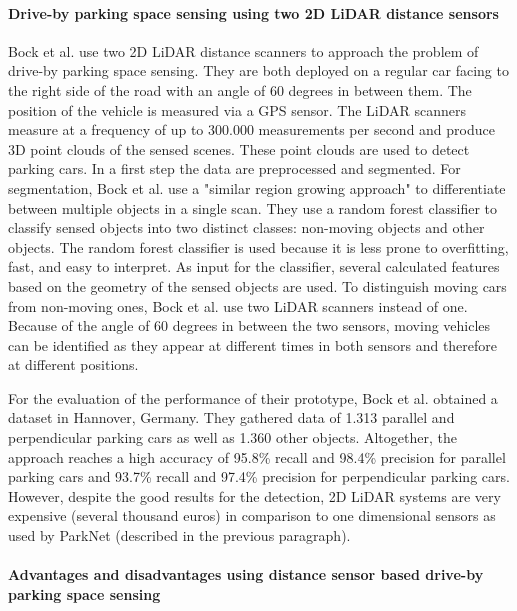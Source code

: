 \paragraph{Drive-by parking space sensing using two 2D LiDAR distance sensors}

Bock et al. \cite{Bock2015} use two 2D LiDAR distance scanners to approach the problem of drive-by parking space sensing. They are both deployed on a regular car facing to the right side of the road with an angle of 60 degrees in between them. The position of the vehicle is measured via a GPS sensor.
The LiDAR scanners measure at a frequency of up to 300.000 measurements per second and produce 3D point clouds of the sensed scenes. These point clouds are used to detect parking cars. In a first step the data are preprocessed and segmented. For segmentation, Bock et al. use a "similar region growing approach" to differentiate between multiple objects in a single scan. They use a random forest classifier to classify sensed objects into two distinct classes: non-moving objects and other objects. The random forest classifier is used because it is less prone to overfitting, fast, and easy to interpret. As input for the classifier, several calculated features based on the geometry of the sensed objects are used. To distinguish moving cars from non-moving ones, Bock et al. use two LiDAR scanners instead of one. Because of the angle of 60 degrees in between the two sensors, moving vehicles can be identified as they appear at different times in both sensors and therefore at different positions.

For the evaluation of the performance of their prototype, Bock et al. obtained a dataset in Hannover, Germany. They gathered data of 1.313 parallel and perpendicular parking cars as well as 1.360 other objects. Altogether, the approach reaches a high accuracy of 95.8\% recall and 98.4\% precision for parallel parking cars and 93.7\% recall and 97.4\% precision for perpendicular parking cars. However, despite the good results for the detection, 2D LiDAR systems are very expensive (several thousand euros) in comparison to one dimensional sensors as used by ParkNet (described in the previous paragraph).


\paragraph{Advantages and disadvantages using distance sensor based drive-by parking space sensing}

